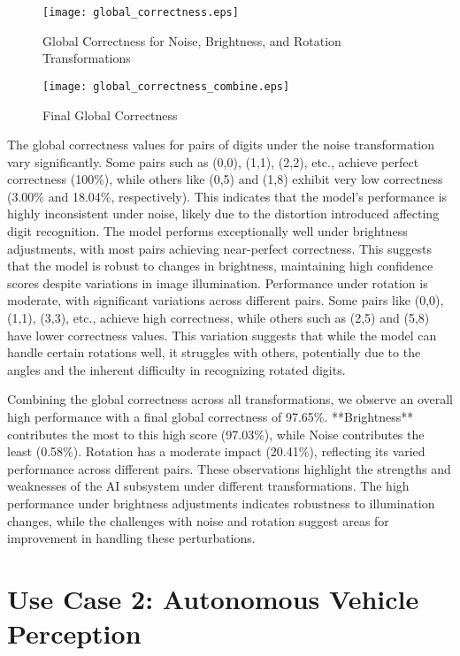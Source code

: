 \begin{figure}[H]
    \centering
    \texttt{[image: global\_correctness.eps]}
    \caption{Global Correctness for Noise, Brightness, and Rotation Transformations}
    \label{fig:global_correctness}
\end{figure}

\begin{figure}[H]
    \centering
    \texttt{[image: global\_correctness\_combine.eps]}
    \caption{Final Global Correctness}
    \label{fig:final_global_correctness}
\end{figure}

The global correctness values for pairs of digits under the noise transformation vary significantly. Some pairs such as (0,0), (1,1), (2,2), etc., achieve perfect correctness (100\%), while others like (0,5) and (1,8) exhibit very low correctness (3.00\% and 18.04\%, respectively). This indicates that the model's performance is highly inconsistent under noise, likely due to the distortion introduced affecting digit recognition. The model performs exceptionally well under brightness adjustments, with most pairs achieving near-perfect correctness. This suggests that the model is robust to changes in brightness, maintaining high confidence scores despite variations in image illumination. Performance under rotation is moderate, with significant variations across different pairs. Some pairs like (0,0), (1,1), (3,3), etc., achieve high correctness, while others such as (2,5) and (5,8) have lower correctness values. This variation suggests that while the model can handle certain rotations well, it struggles with others, potentially due to the angles and the inherent difficulty in recognizing rotated digits.

Combining the global correctness across all transformations, we observe an overall high performance with a final global correctness of 97.65\%. **Brightness** contributes the most to this high score (97.03\%), while Noise contributes the least (0.58\%). Rotation has a moderate impact (20.41\%), reflecting its varied performance across different pairs. These observations highlight the strengths and weaknesses of the AI subsystem under different transformations. The high performance under brightness adjustments indicates robustness to illumination changes, while the challenges with noise and rotation suggest areas for improvement in handling these perturbations.


\section{Use Case 2: Autonomous Vehicle Perception}


